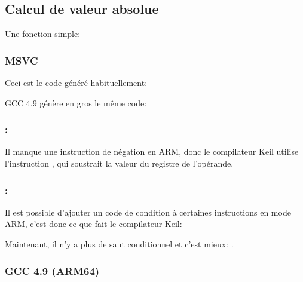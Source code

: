 \subsection{Calcul de valeur absolue}
\label{sec:abs}

Une fonction simple:



\subsubsection{MSVC \Optimizing}

Ceci est le code généré habituellement:



GCC 4.9 génère en gros le même code:

\subsubsection{\OptimizingKeilVI: \ThumbMode}




Il manque une instruction de négation en ARM, donc le compilateur Keil utilise l'instruction
, qui soustrait la valeur du registre de l'opérande.

\subsubsection{\OptimizingKeilVI: \ARMMode}

Il est possible d'ajouter un code de condition à certaines instructions en mode
ARM, c'est donc ce que fait le compilateur Keil:



Maintenant, il n'y a plus de saut conditionnel et c'est mieux: .

\subsubsection{GCC 4.9 \NonOptimizing (ARM64)}



